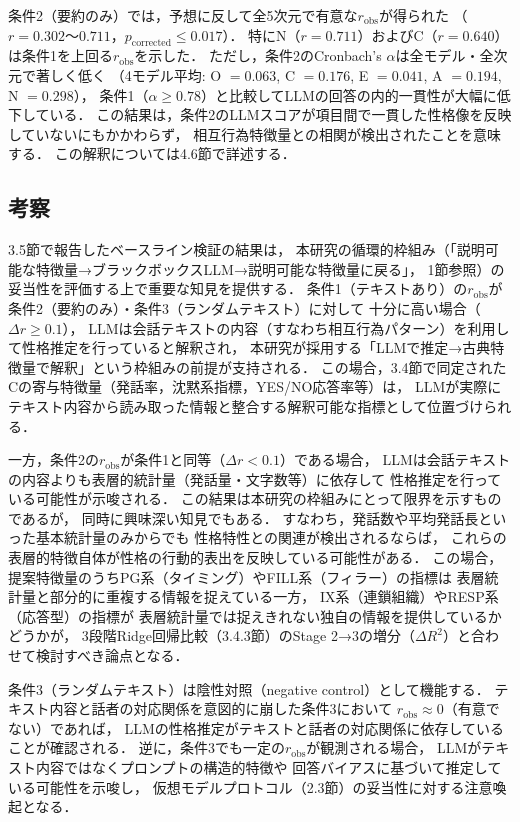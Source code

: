 \documentclass[dvipdfmx,11pt,a4paper]{bxjsarticle}
\renewcommand{\_}{\paperorigunderscore\allowbreak}%
\begin{document}
条件2（要約のみ）では，予想に反して全5次元で有意な$r_{\text{obs}}$が得られた
（$r = 0.302$〜$0.711$，$p_{\text{corrected}} \leq 0.017$）．
特にN（$r = 0.711$）およびC（$r = 0.640$）は条件1を上回る$r_{\text{obs}}$を示した．
ただし，条件2のCronbach's $\alpha$は全モデル・全次元で著しく低く
（4モデル平均: O $= 0.063$, C $= 0.176$, E $= 0.041$, A $= 0.194$, N $= 0.298$），
条件1（$\alpha \geq 0.78$）と比較してLLMの回答の内的一貫性が大幅に低下している．
この結果は，条件2のLLMスコアが項目間で一貫した性格像を反映していないにもかかわらず，
相互行為特徴量との相関が検出されたことを意味する．
この解釈については4.6節で詳述する．

\subsection{考察}
\label{sec:discuss_baseline}


3.5節で報告したベースライン検証の結果は，
本研究の循環的枠組み（「説明可能な特徴量→ブラックボックスLLM→説明可能な特徴量に戻る」，
1節参照）の妥当性を評価する上で重要な知見を提供する．
条件1（テキストあり）の$r_{\text{obs}}$が条件2（要約のみ）・条件3（ランダムテキスト）に対して
十分に高い場合（$\Delta r \geq 0.1$），
LLMは会話テキストの内容（すなわち相互行為パターン）を利用して性格推定を行っていると解釈され，
本研究が採用する「LLMで推定→古典特徴量で解釈」という枠組みの前提が支持される．
この場合，3.4節で同定されたCの寄与特徴量（発話率，沈黙系指標，YES/NO応答率等）は，
LLMが実際にテキスト内容から読み取った情報と整合する解釈可能な指標として位置づけられる．

一方，条件2の$r_{\text{obs}}$が条件1と同等（$\Delta r < 0.1$）である場合，
LLMは会話テキストの内容よりも表層的統計量（発話量・文字数等）に依存して
性格推定を行っている可能性が示唆される．
この結果は本研究の枠組みにとって限界を示すものであるが，
同時に興味深い知見でもある．
すなわち，発話数や平均発話長といった基本統計量のみからでも
性格特性との関連が検出されるならば，
これらの表層的特徴自体が性格の行動的表出を反映している可能性がある．
この場合，提案特徴量のうちPG系（タイミング）やFILL系（フィラー）の指標は
表層統計量と部分的に重複する情報を捉えている一方，
IX系（連鎖組織）やRESP系（応答型）の指標が
表層統計量では捉えきれない独自の情報を提供しているかどうかが，
3段階Ridge回帰比較（3.4.3節）のStage 2→3の増分（$\Delta R^2$）と合わせて検討すべき論点となる．

条件3（ランダムテキスト）は陰性対照（negative control）として機能する．
テキスト内容と話者の対応関係を意図的に崩した条件3において
$r_{\text{obs}} \approx 0$（有意でない）であれば，
LLMの性格推定がテキストと話者の対応関係に依存していることが確認される．
逆に，条件3でも一定の$r_{\text{obs}}$が観測される場合，
LLMがテキスト内容ではなくプロンプトの構造的特徴や
回答バイアスに基づいて推定している可能性を示唆し，
仮想モデルプロトコル（2.3節）の妥当性に対する注意喚起となる．
\end{document}
